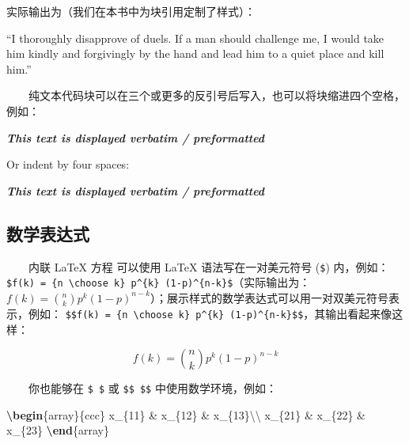 \documentclass[
  12pt,
]{krantz}
\newenvironment{Shaded}{\begin{snugshade}}{\end{snugshade}}
\newcommand{\ExtensionTok}[1]{#1}
\newcommand{\InformationTok}[1]{\textcolor[rgb]{0.56,0.35,0.01}{\textbf{\textit{#1}}}}
\newcommand{\KeywordTok}[1]{\textcolor[rgb]{0.13,0.29,0.53}{\textbf{#1}}}
\newcommand{\NormalTok}[1]{#1}
\newcommand{\SpecialCharTok}[1]{\textcolor[rgb]{0.00,0.00,0.00}{#1}}
\newcommand{\SpecialStringTok}[1]{\textcolor[rgb]{0.31,0.60,0.02}{#1}}
\renewenvironment{quote}{\begin{VF}}{\end{VF}}
\theoremstyle{definition}
\theoremstyle{definition}
\theoremstyle{definition}
\theoremstyle{definition}
\theoremstyle{remark}
\begin{document}
实际输出为（我们在本书中为块引用定制了样式）：

\begin{quote}
``I thoroughly disapprove of duels. If a man should challenge me,
I would take him kindly and forgivingly by the hand and lead him
to a quiet place and kill him.''

\end{quote}

  纯文本代码块可以在三个或更多的反引号后写入，也可以将块缩进四个空格，例如：

\begin{Shaded}
\begin{Highlighting}[]
\InformationTok{\textasciigrave{}\textasciigrave{}\textasciigrave{}}
\InformationTok{This text is displayed verbatim / preformatted}
\InformationTok{\textasciigrave{}\textasciigrave{}\textasciigrave{}}

\NormalTok{Or indent by four spaces:}

\InformationTok{    This text is displayed verbatim / preformatted}
\end{Highlighting}
\end{Shaded}

\hypertarget{ux6570ux5b66ux8868ux8fbeux5f0f}{%
\subsection{数学表达式}\label{ux6570ux5b66ux8868ux8fbeux5f0f}}

  内联 LaTeX 方程 可以使用 LaTeX 语法写在一对美元符号 (\texttt{\$}) 内，例如：\texttt{\$f(k)\ =\ \{n\ \textbackslash{}choose\ k\}\ p\^{}\{k\}\ (1-p)\^{}\{n-k\}\$}（实际输出为：\(f(k)={n \choose k}p^{k}(1-p)^{n-k}\)）；展示样式的数学表达式可以用一对双美元符号表示，例如： \texttt{\$\$f(k)\ =\ \{n\ \textbackslash{}choose\ k\}\ p\^{}\{k\}\ (1-p)\^{}\{n-k\}\$\$}，其输出看起来像这样：

\[f\left(k\right)=\binom{n}{k}p^k\left(1-p\right)^{n-k}\]

  你也能够在 \texttt{\$\ \$} 或 \texttt{\$\$\ \$\$} 中使用数学环境，例如：

\begin{Shaded}
\begin{Highlighting}[]
\SpecialStringTok{$$}\KeywordTok{\textbackslash{}begin}\NormalTok{\{}\ExtensionTok{array}\NormalTok{\}}\SpecialStringTok{\{ccc\}}
\SpecialStringTok{x\_\{11\} \& x\_\{12\} \& x\_\{13\}}\SpecialCharTok{\textbackslash{}\textbackslash{}}
\SpecialStringTok{x\_\{21\} \& x\_\{22\} \& x\_\{23\}}
\KeywordTok{\textbackslash{}end}\NormalTok{\{}\ExtensionTok{array}\NormalTok{\}}\SpecialStringTok{$$}
\end{Highlighting}
\end{Shaded}
\end{document}
